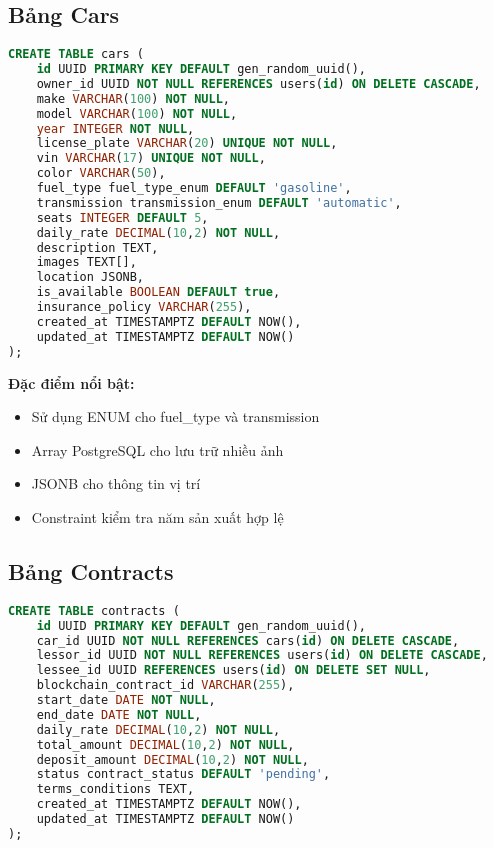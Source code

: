 \documentclass[12pt,a4paper]{article}
\begin{document}
\subsection{Bảng Cars}
\begin{lstlisting}[language=SQL, caption=Cấu trúc bảng cars]
CREATE TABLE cars (
    id UUID PRIMARY KEY DEFAULT gen_random_uuid(),
    owner_id UUID NOT NULL REFERENCES users(id) ON DELETE CASCADE,
    make VARCHAR(100) NOT NULL,
    model VARCHAR(100) NOT NULL,
    year INTEGER NOT NULL,
    license_plate VARCHAR(20) UNIQUE NOT NULL,
    vin VARCHAR(17) UNIQUE NOT NULL,
    color VARCHAR(50),
    fuel_type fuel_type_enum DEFAULT 'gasoline',
    transmission transmission_enum DEFAULT 'automatic',
    seats INTEGER DEFAULT 5,
    daily_rate DECIMAL(10,2) NOT NULL,
    description TEXT,
    images TEXT[],
    location JSONB,
    is_available BOOLEAN DEFAULT true,
    insurance_policy VARCHAR(255),
    created_at TIMESTAMPTZ DEFAULT NOW(),
    updated_at TIMESTAMPTZ DEFAULT NOW()
);
\end{lstlisting}

\textbf{Đặc điểm nổi bật:}
\begin{itemize}
    \item Sử dụng ENUM cho fuel\_type và transmission
    \item Array PostgreSQL cho lưu trữ nhiều ảnh
    \item JSONB cho thông tin vị trí
    \item Constraint kiểm tra năm sản xuất hợp lệ
\end{itemize}

\subsection{Bảng Contracts}
\begin{lstlisting}[language=SQL, caption=Cấu trúc bảng contracts]
CREATE TABLE contracts (
    id UUID PRIMARY KEY DEFAULT gen_random_uuid(),
    car_id UUID NOT NULL REFERENCES cars(id) ON DELETE CASCADE,
    lessor_id UUID NOT NULL REFERENCES users(id) ON DELETE CASCADE,
    lessee_id UUID REFERENCES users(id) ON DELETE SET NULL,
    blockchain_contract_id VARCHAR(255),
    start_date DATE NOT NULL,
    end_date DATE NOT NULL,
    daily_rate DECIMAL(10,2) NOT NULL,
    total_amount DECIMAL(10,2) NOT NULL,
    deposit_amount DECIMAL(10,2) NOT NULL,
    status contract_status DEFAULT 'pending',
    terms_conditions TEXT,
    created_at TIMESTAMPTZ DEFAULT NOW(),
    updated_at TIMESTAMPTZ DEFAULT NOW()
);
\end{lstlisting}
\end{document}
